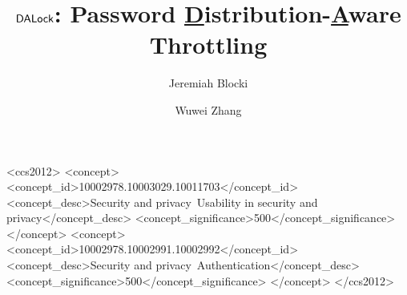 \documentclass[sigconf,anonymous=true]{acmart}
\begin{document}
\title{$\mathsf{DALock}$: Password \underline{D}istribution-\underline{A}ware Throttling}

\author{Jeremiah Blocki}
\author{Wuwei Zhang}



\renewcommand{\shortauthors}{Blocki and Zhang}

\begin{abstract}

\end{abstract}

\begin{CCSXML}
	<ccs2012>
	<concept>
	<concept_id>10002978.10003029.10011703</concept_id>
	<concept_desc>Security and privacy~Usability in security and privacy</concept_desc>
	<concept_significance>500</concept_significance>
	</concept>
	<concept>
	<concept_id>10002978.10002991.10002992</concept_id>
	<concept_desc>Security and privacy~Authentication</concept_desc>
	<concept_significance>500</concept_significance>
	</concept>
	</ccs2012>
\end{CCSXML}





\maketitle


 



\end{document}
